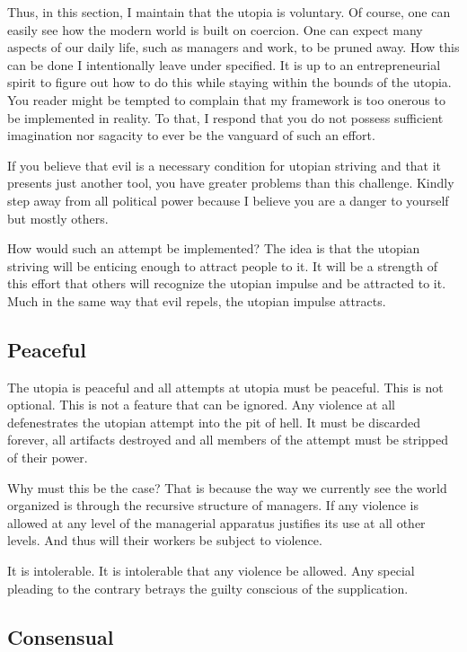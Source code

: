 \documentclass[12pt]{article}
\begin{document}
Thus, in this section, I maintain that the utopia is voluntary.
Of course, one can easily see how the modern world is built on coercion.
One can expect many aspects of our daily life, such as managers and work, to be pruned away.
How this can be done I intentionally leave under specified.
It is up to an entrepreneurial spirit to figure out how to do this while staying within the bounds of the utopia.
You reader might be tempted to complain that my framework is too onerous to be implemented in reality.
To that, I respond that you do not possess sufficient imagination nor sagacity to ever be the vanguard of such an effort.

If you believe that evil is a necessary condition for utopian striving and that it presents just another tool, you have greater problems than this challenge.
Kindly step away from all political power because I believe you are a danger to yourself but mostly others.

How would such an attempt be implemented?
The idea is that the utopian striving will be enticing enough to attract people to it.
It will be a strength of this effort that others will recognize the utopian impulse and be attracted to it.
Much in the same way that evil repels, the utopian impulse attracts.

\subsection{Peaceful}
The utopia is peaceful and all attempts at utopia must be peaceful.
This is not optional.
This is not a feature that can be ignored.
Any violence at all defenestrates the utopian attempt into the pit of hell.
It must be discarded forever, all artifacts destroyed and all members of the attempt must be stripped of their power.

Why must this be the case?
That is because the way we currently see the world organized is through the recursive structure of managers.
If any violence is allowed at any level of the managerial apparatus justifies its use at all other levels.
And thus will their workers be subject to violence.

It is intolerable.
It is intolerable that any violence be allowed.
Any special pleading to the contrary betrays the guilty conscious of the supplication.


\subsection{Consensual}
\end{document}
